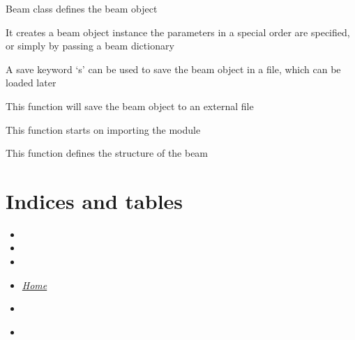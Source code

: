 \documentclass[letterpaper,10pt,english]{sphinxmanual}
\begin{document}
\begin{fulllineitems}
\label{beam:beam.beam}
Beam class defines the beam object

It creates a beam object instance the parameters in a special order are specified, or simply by passing a beam dictionary

A save keyword `s' can be used to save the beam object in a file, which can be loaded later

\begin{fulllineitems}
\label{beam:beam.beam.save}
This function will save the beam object to an external file

\end{fulllineitems}


\end{fulllineitems}


\begin{fulllineitems}
\label{beam:beam.beam_initiate}
This function starts on importing the module

\end{fulllineitems}


\begin{fulllineitems}
\label{beam:beam.beam_structure}
This function defines the structure of the beam

\end{fulllineitems}



\section{Indices and tables}
\label{beam:indices-and-tables}\begin{itemize}
\item {} 

\item {} 

\item {} 

\item {} 
{\hyperref[index::doc]{\emph{\emph{Home}}}}

\item {} 
{\hyperref[index:index-label]{\emph{}}}

\item {} 
{\hyperref[beam:beam-label]{\emph{}}}

\end{itemize}
\end{document}
